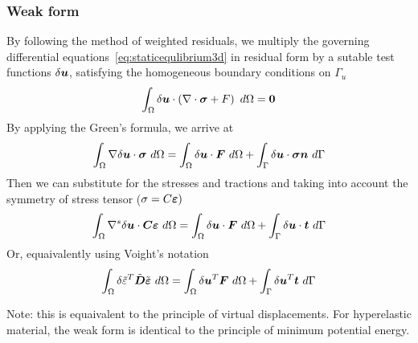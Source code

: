 \subsubsection{Weak form}

  By following the method of weighted residuals, we multiply the governing differential equations~\ref{eq:staticequlibrium3d} in residual form by a sutable test functions $\delta\mbox{\boldmath$u$}$, satisfying the homogeneous boundary conditions on $\Gamma_u$
  $$
  \int_\Omega \delta\mbox{\boldmath$u$} \cdot \left(
  \nabla\cdot\mbox{\boldmath$\sigma$} + F \right)\ d\Omega = \mbox{\boldmath$0$}
  $$
  By applying the Green's formula, we arrive at
  $$
  \int_\Omega\grad\delta\mbf{u}\cdot\mbf{\sigma}\ d\Omega =
  \int_\Omega\delta\mbf{u}\cdot\mbf{F}\ d\Omega + \int_\Gamma\delta\mbf{u}\cdot\mbf{\sigma}\mbf{n}\ d\Gamma
  $$
  Then we can substitute for the stresses and tractions and taking into account the symmetry of stress tensor ($\sigma=C\mbox{\boldmath$\varepsilon$})$
  \begin{equation}
  \int_\Omega\grad^s\delta\mbf{u}\cdot\mbf{C}\mbf{\eps}\ d\Omega =
  \int_\Omega\delta\mbf{u}\cdot\mbf{F}\ d\Omega + \int_\Gamma\delta\mbf{u}\cdot\mbf{t}\ d\Gamma
  \label{weakform3d}
  \end{equation}
  Or, equaivalently using Voight's notation
  \begin{equation}
  \int_\Omega\delta\tilde{\eps}^T\tilde{\mbf{D}}\tilde{\mbf{\eps}}\ d\Omega =
  \int_\Omega\delta\mbf{u}^T\mbf{F}\ d\Omega + \int_\Gamma\delta\mbf{u}^T\mbf{t}\ d\Gamma
  \label{eq:weakformvoight}
  \end{equation}
  
  Note: this is equaivalent to the principle of virtual displacements. For hyperelastic material, the weak form is identical to the principle of minimum potential energy.

  
